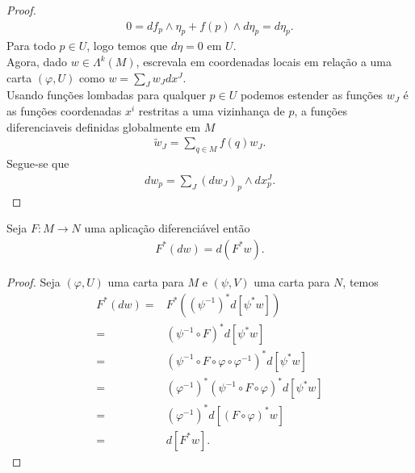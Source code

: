 \begin{proof}
  \begin{align*}
    0=df_{p}\wedge\eta_{p}+f(p)\wedge d\eta_{p}=d\eta_p.
  \end{align*}
  Para todo $p\in U$, logo temos que $d\eta=0$ em $U$.\\
  Agora, dado $w\in\Lambda^{k}(M)$, escrevala em coordenadas locais em relação a uma carta $(\varphi,U)$ como $w=\sum_{J}w_Jdx^{J}$.\\
  Usando funções lombadas para qualquer $p\in U$ podemos estender as funções $w_J$ é as funções coordenadas $x^{i}$ restritas a uma vizinhança de $p$, a funções diferenciaveis definidas globalmente em $M$
  \begin{align*}
    \tilde{w}_{J}=\sum_{q\in M}f(q)w_J.
  \end{align*}
  Segue-se que
  \begin{align*}
    dw_p=\sum_{J}(dw_J)_{p}\wedge dx^{J}_p.
  \end{align*}
\end{proof}
\begin{proposition}
  Seja $F:M\to N$ uma aplicação diferenciável então
  \begin{align*}
    F^{\ast}(dw)=d(F^{\ast}w).
  \end{align*}
\end{proposition}
\begin{proof} 
  Seja $(\varphi,U)$ uma carta para $M$ e $(\psi,V)$ uma carta para $N$, temos
  \begin{align*}
    F^{\ast}(dw)=&F^{\ast}\left( (\psi^{-1})^{\ast}d\left[ \psi^{\ast}w \right] \right)\\
    =&(\psi^{-1}\circ F)^{\ast}d\left[ \psi^{\ast}w \right]\\
    =&(\psi^{-1}\circ F\circ\varphi\circ\varphi^{-1})^{\ast}d\left[ \psi^{\ast}w \right]\\
    =&(\varphi^{-1})^{\ast}(\psi^{-1}\circ F\circ\varphi)^{\ast}d\left[ \psi^{\ast}w \right]\\
    =&(\varphi^{-1})^{\ast}d\left[ (F\circ\varphi)^{\ast}w \right]\\
    =&d\left[ F^{\ast}w \right].
  \end{align*}
\end{proof}
